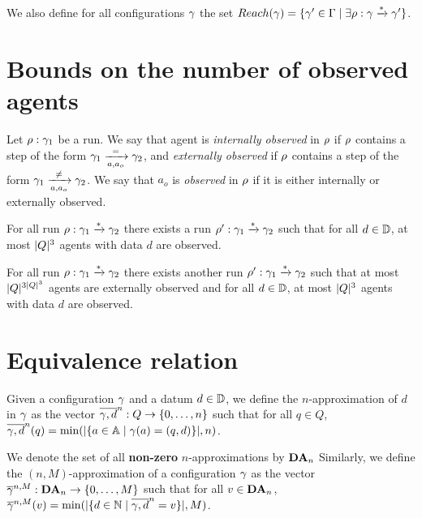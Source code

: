 \documentclass[a4paper,UKenglish,cleveref, autoref, thm-restate]{lipics-v2021}
\newcommand{\corto}[1]{\todo[color=blue!20]{\small #1}}
\begin{document}
	We also define for all configurations $\config$ the set $\Reach(\config) = \set{\config' \in \configset \mid \exists \run : \config \xrightarrow{*} \config'}$.

	\section{Bounds on the number of observed agents}
	
		\begin{definition}
		Let $\run : \config_1$ be a run.
		We say that agent is \emph{internally observed} in $\run$ if $\run$ contains a step of the form $\config_1 \step{=}{a}{a_o} \config_2$, and \emph{externally observed} if $\run$ contains a step of the form $\config_1 \step{\neq}{a}{a_o} \config_2$.
		We say that $a_o$ is \emph{observed} in $\run$ if it is either internally or externally observed.
	\end{definition}
	
	
	\begin{lemma}
		For all run $\run : \config_1 \xrightarrow{*} \config_2$ there exists a run $\run' : \config_1 \xrightarrow{*} \config_2$ such that for all $d \in \Dataset$, at most $\size{Q}^3$ agents with data $d$ are observed.
	\end{lemma}
	

	
	\begin{lemma}
		For all run $\run : \config_1 \xrightarrow{*} \config_2$ there exists another run $\run' : \config_1 \xrightarrow{*} \config_2$ such that at most $\size{Q}^{3\size{Q}^3}$\corto{Tentative bound} agents are externally observed and for all $d \in \Dataset$, at most $\size{Q}^3$ agents with data $d$ are observed.
	\end{lemma}
	 
	
	\section{Equivalence relation}
	
	Given a configuration $\config$ and a datum $d \in \Dataset$, we define the $n$-approximation of $d$ in $\config$ as the vector $\dataapprox{n}{\config}{d} : Q \to \nset{0}{n}$ such that for all $q\in Q$, $\dataapprox{n}{\config}{d}(q)=\min(\size{\set{a \in \Agentset \mid \config(a)= (q,d)}},n)$.
	
	We denote the set of all \textbf{non-zero} $n$-approximations by $\DataApproxSet{n}$
	Similarly, we define the $(n,M)$-approximation of a configuration $\config$ as the vector $\configapprox{n}{M}{\config} : \DataApproxSet{n} \to \nset{0}{M}$ such that for all $v\in \DataApproxSet{n}$,
	$\configapprox{n}{M}{\config}(v) = \min(\size{\set{d \in \nats \mid \dataapprox{n}{\config}{d} = v}},M)$.
	
\end{document}
